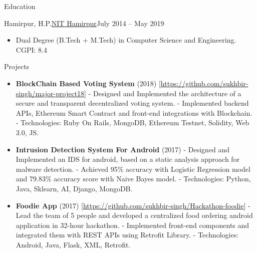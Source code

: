 \documentclass[]{mcdowellcv}
\begin{document}
	\begin{cvsection}{Education}
		\begin{cvsubsection}{Hamirpur, H.P.}{\href {http://nith.ac.in/}{NIT Hamirpur}}{July 2014 -- May 2019}
			\begin{itemize}
				\item Dual Degree (B.Tech + M.Tech) in Computer Science and Engineering. CGPI: 8.4
			\end{itemize}
		\end{cvsubsection}
	\end{cvsection}
	
	\begin{cvsection}{Projects}
		\begin{cvsubsection}{}{}{}
			\begin{itemize}
				\item \textbf{BlockChain Based Voting System} (2018) \textcolor[rgb]{.2,.2,.2}{[\href {https://github.com/sukhbir-singh/major-project18}{https://github.com/sukhbir-singh/major-project18}]}
				\newline- Designed and Implemented the architecture of a secure and transparent decentralized voting system.
				\newline- Implemented backend APIs, Ethereum Smart Contract and front-end integrations with Blockchain.
				\newline- Technologies: Ruby On Rails, MongoDB, Ethereum Testnet, Solidity, Web 3.0, JS.
				\newline
				\item \textbf{Intrusion Detection System For Android} (2017) 
				\newline- Designed and Implemented an IDS for android, based on a static analysis approach for malware detection.
				\newline- Achieved 95\% accuracy with Logistic Regression model and 79.83\% accuracy score with Naive Bayes model.
				\newline- Technologies: Python, Java, Sklearn, AI, Django, MongoDB.
				\newline
				\item \textbf{Foodie App} (2017) \textcolor[rgb]{.2,.2,.2}{[\href {https://github.com/sukhbir-singh/Hackathon-foodie}{https://github.com/sukhbir-singh/Hackathon-foodie}]}
				\newline- Lead the team of 5 people and developed a centralized food ordering android application in 32-hour hackathon.
				\newline- Implemented front-end components and integrated them with REST APIs using Retrofit Library.
				\newline- Technologies: Android, Java, Flask, XML, Retrofit.				

			\end{itemize}
		\end{cvsubsection}
	\end{cvsection}
\end{document}
